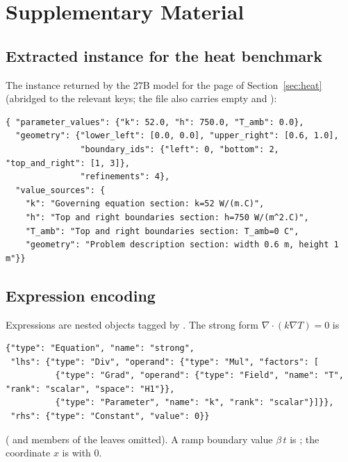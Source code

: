 \section{Supplementary Material}
\label{app:supp}

\subsection{Extracted instance for the heat benchmark}
The instance returned by the 27B model for the page of Section~\ref{sec:heat} (abridged to the relevant keys; the file also carries empty  and ):
\begin{lstlisting}
{ "parameter_values": {"k": 52.0, "h": 750.0, "T_amb": 0.0},
  "geometry": {"lower_left": [0.0, 0.0], "upper_right": [0.6, 1.0],
               "boundary_ids": {"left": 0, "bottom": 2, "top_and_right": [1, 3]},
               "refinements": 4},
  "value_sources": {
    "k": "Governing equation section: k=52 W/(m.C)",
    "h": "Top and right boundaries section: h=750 W/(m^2.C)",
    "T_amb": "Top and right boundaries section: T_amb=0 C",
    "geometry": "Problem description section: width 0.6 m, height 1 m"}}
\end{lstlisting}

\subsection{Expression encoding}
Expressions are nested objects tagged by . The strong form $\nabla\cdot(k\nabla T)=0$ is
\begin{lstlisting}
{"type": "Equation", "name": "strong",
 "lhs": {"type": "Div", "operand": {"type": "Mul", "factors": [
          {"type": "Grad", "operand": {"type": "Field", "name": "T", "rank": "scalar", "space": "H1"}},
          {"type": "Parameter", "name": "k", "rank": "scalar"}]}},
 "rhs": {"type": "Constant", "value": 0}}
\end{lstlisting}
( and  members of the leaves omitted). A ramp boundary value $\beta\,t$ is ; the coordinate $x$ is  with  $0$.

